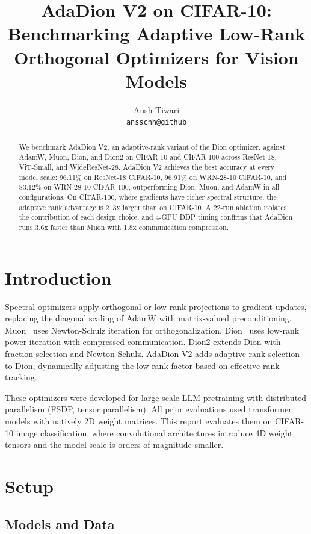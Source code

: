 \documentclass[10pt,twocolumn]{article}
\title{AdaDion V2 on CIFAR-10: Benchmarking Adaptive Low-Rank Orthogonal Optimizers for Vision Models}
\author{
  Ansh Tiwari \\
  \texttt{ansschh@github}
}
\date{}
\begin{document}
\maketitle

\begin{abstract}
We benchmark AdaDion V2, an adaptive-rank variant of the Dion optimizer, against AdamW, Muon, Dion, and Dion2 on CIFAR-10 and CIFAR-100 across ResNet-18, ViT-Small, and WideResNet-28. AdaDion V2 achieves the best accuracy at every model scale: 96.11\% on ResNet-18 CIFAR-10, 96.91\% on WRN-28-10 CIFAR-10, and 83.12\% on WRN-28-10 CIFAR-100, outperforming Dion, Muon, and AdamW in all configurations. On CIFAR-100, where gradients have richer spectral structure, the adaptive rank advantage is 2--3x larger than on CIFAR-10. A 22-run ablation isolates the contribution of each design choice, and 4-GPU DDP timing confirms that AdaDion runs 3.6x faster than Muon with 1.8x communication compression.
\end{abstract}

\section{Introduction}

Spectral optimizers apply orthogonal or low-rank projections to gradient updates, replacing the diagonal scaling of AdamW with matrix-valued preconditioning. Muon~\cite{jordan2024muon} uses Newton-Schulz iteration for orthogonalization. Dion~\cite{ahn2024dion} uses low-rank power iteration with compressed communication. Dion2 extends Dion with fraction selection and Newton-Schulz. AdaDion V2 adds adaptive rank selection to Dion, dynamically adjusting the low-rank factor based on effective rank tracking.

These optimizers were developed for large-scale LLM pretraining with distributed parallelism (FSDP, tensor parallelism). All prior evaluations used transformer models with natively 2D weight matrices. This report evaluates them on CIFAR-10 image classification, where convolutional architectures introduce 4D weight tensors and the model scale is orders of magnitude smaller.

\section{Setup}

\subsection{Models and Data}
\end{document}
